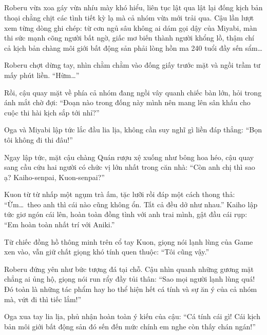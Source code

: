 \documentclass[../main.tex]{subfiles}
\begin{document}
\newpage

\subsection*{\label{ep-M8.VIII}}
\vspace{-4pt}

Roberu vừa xoa gáy vừa nhíu mày khó hiểu, liên tục lật qua lật lại đống kịch bản thoại chằng chịt các tình tiết kỳ lạ mà cả nhóm vừa mới trải qua. Cậu lần lượt xem từng dòng ghi chép: từ cơn ngủ sâu không ai dám gọi dậy của Miyabi, màn thi sức mạnh cõng người bất ngờ, giấc mơ biến thành người khổng lồ, thậm chí cả kịch bản chàng môi giới bất động sản phải lòng hồn ma 240 tuổi đầy sến sẩm\dots


Roberu chợt dừng tay, nhìn chằm chằm vào đống giấy trước mặt và ngồi trầm tư mấy phút liền. ``Hừm\dots''

Rồi, cậu quay mặt về phía cả nhóm đang ngồi vây quanh chiếc bàn lớn, hỏi trong ánh mắt chờ đợi: ``Đoạn nào trong đống này mình nên mang lên sân khấu cho cuộc thi hài kịch sắp tới nhỉ?''

Oga và Miyabi lập tức lắc đầu lia lịa, không cần suy nghĩ gì liền đáp thẳng: ``Bọn tôi không đi thi đâu!''

Ngay lập tức, mặt cậu chàng Quán rượu xệ xuống như bông hoa héo, cậu quay sang cầu cứu hai người có chức vị lớn nhất trong căn nhà: ``Còn anh chị thì sao ạ? Kaiho-senpai, Kuon-senpai?''

Kuon từ từ nhấp một ngụm trà ấm, tặc lưỡi rồi đáp một cách thong thả: ``Ừm\dots\ theo anh thì cái nào cũng không ổn. Tất cả đều dở như nhau.'' Kaiho lập tức giơ ngón cái lên, hoàn toàn đồng tình với anh trai mình, gật đầu cái rụp: ``Em hoàn toàn nhất trí với Aniki.''

Từ chiếc đồng hồ thông minh trên cổ tay Kuon, giọng nói lạnh lùng của Game xen vào, vẫn giữ chất giọng khó tính quen thuộc: ``Tôi cũng vậy.''

Roberu đứng yên như bức tượng đá tại chỗ. Cậu nhìn quanh những gương mặt chẳng ai ủng hộ, giọng nói run rẩy đầy tủi thân: ``Sao mọi người lạnh lùng quá! Đó toàn là những tác phẩm hay ho thể hiện hết cá tính và sự ăn ý của cả nhóm mà, vứt đi thì tiếc lắm!''

Oga xua tay lia lịa, phủ nhận hoàn toàn ý kiến của cậu: ``Cá tính cái gì! Cái kịch bản môi giới bất động sản đó sến đến mức chính em nghe còn thấy chán ngán!''
\end{document}

